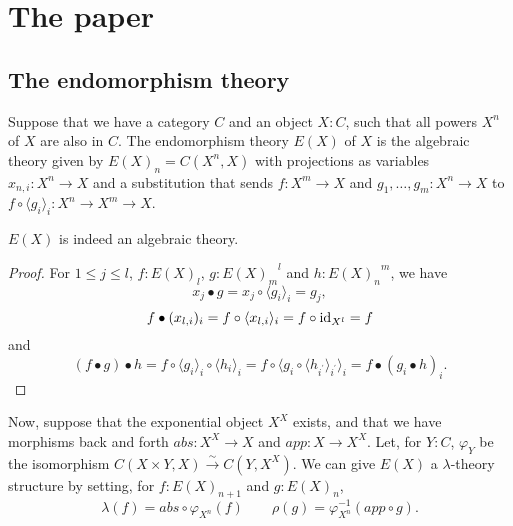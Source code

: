 \chapter{The paper}

\section{The endomorphism theory}

\begin{definition}
  Suppose that we have a category $ C $ and an object $ X: C $, such that all powers $ X^n $ of $ X $ are also in $ C $.
  The endomorphism theory $ E(X) $ of $ X $ is the algebraic theory given by $ E(X)_n = C(X^n, X) $ with projections as variables $ x_{n, i}: X^n \to X $ and a substitution that sends $ f: X^m \to X $ and $ g_1, \dots, g_m: X^n \to X $ to $ f \circ \langle g_i \rangle_i: X^n \to X^m \to X $.
\end{definition}

\begin{lemma}
  $ E(X) $ is indeed an algebraic theory.
\end{lemma}
\begin{proof}
  For $ 1 \leq j \leq l $, $ f: E(X)_l $, $ g: {E(X)_m}^l $ and $ h: {E(X)_n}^m $, we have
  \[ x_j \bullet g = x_j \circ \langle g_i \rangle_i = g_j, \]
  \[ f \bullet (x_{l,i})_i = f \circ \langle x_{l, i} \rangle_i = f \circ \text{id}_{X^l} = f \]
  and
  \[ (f \bullet g) \bullet h = f \circ \langle g_i \rangle_i \circ \langle h_i \rangle_i = f \circ \langle g_i \circ \langle h_{i^\prime} \rangle_{i^\prime} \rangle_i = f \bullet (g_i \bullet h)_i. \]
\end{proof}

\begin{definition}
  Now, suppose that the exponential object $ X^X $ exists, and that we have morphisms back and forth $ abs: X^X \to X $ and $ app: X \to X^X $. Let, for $ Y: C $, $ \varphi_Y $ be the isomorphism $ C(X \times Y, X) \xrightarrow{\sim} C(Y, X^X) $.
  We can give $ E(X) $ a $ \lambda $-theory structure by setting, for $ f: E(X)_{n + 1} $ and $ g: E(X)_n $,
  \[ \lambda(f) = abs \circ \varphi_{X^n}(f) \qquad \rho(g) = \varphi_{X^n}^{-1}(app \circ g). \]
\end{definition}

